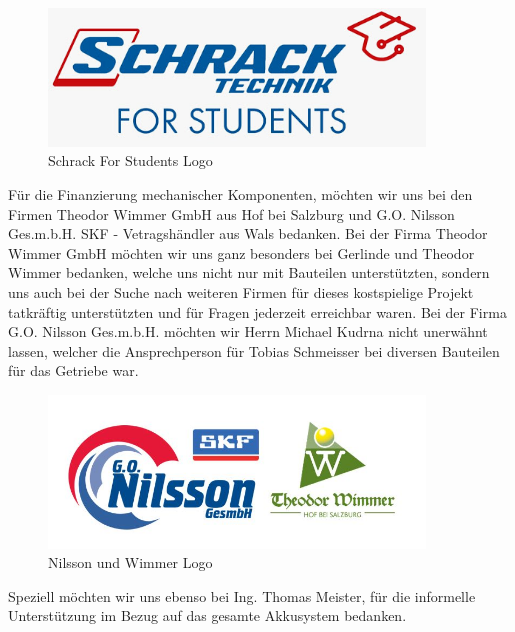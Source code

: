 \begin{figure}[H]
	\begin{center}
		\includegraphics[width=10cm]{figures/allgemein/Schrack_Logo.jpg}
		\caption{Schrack For Students Logo}
	\end{center}
\end{figure}

Für die Finanzierung mechanischer Komponenten, möchten wir uns bei den Firmen Theodor Wimmer GmbH aus Hof bei Salzburg und G.O. Nilsson Ges.m.b.H. SKF - Vetragshändler aus Wals bedanken. Bei der Firma Theodor Wimmer GmbH möchten wir uns ganz besonders bei Gerlinde und Theodor Wimmer bedanken, welche uns nicht nur mit Bauteilen unterstützten, sondern uns auch bei der Suche nach weiteren Firmen für dieses kostspielige Projekt tatkräftig unterstützten und für Fragen jederzeit erreichbar waren. Bei der Firma G.O. Nilsson Ges.m.b.H. möchten wir Herrn Michael Kudrna nicht unerwähnt lassen, welcher die Ansprechperson für Tobias Schmeisser bei diversen Bauteilen für das Getriebe war.

\begin{figure} [H]
	\begin{center}
		\includegraphics[width=10cm]{figures/mechanik/Sponsoren.jpg}	
		\caption{Nilsson und Wimmer Logo}	
	\end{center}
\end{figure}
	
Speziell möchten wir uns ebenso bei Ing. Thomas Meister, für die informelle Unterstützung im Bezug auf das gesamte Akkusystem bedanken.

\newpage


\vspace{0,5cm}
	
